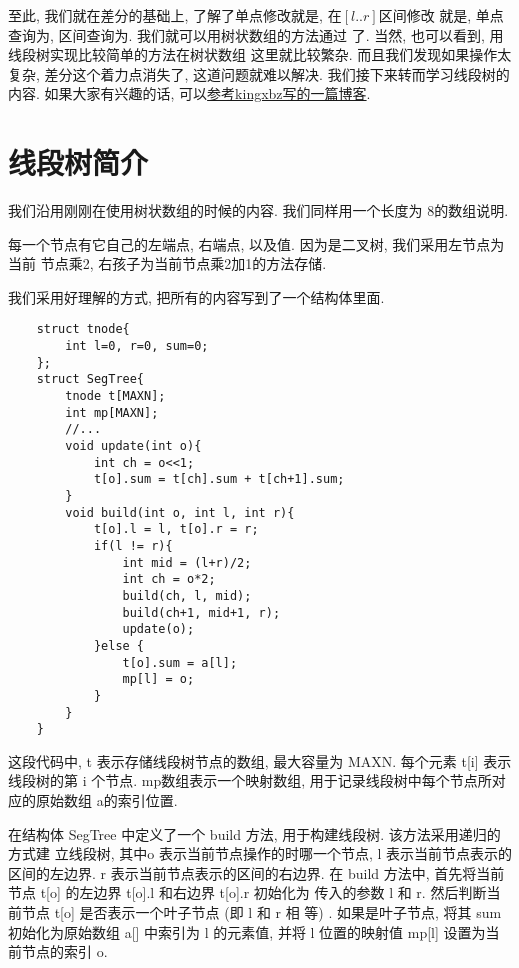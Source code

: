 至此,  我们就在差分的基础上, 了解了单点修改就是, 在$[l..r]$区间修改 
就是, 单点查询为, 
区间查询为. 我们就可以用树状数组的方法通过
了. 当然, 也可以看到, 用线段树实现比较简单的方法在树状数组
这里就比较繁杂. 而且我们发现如果操作太复杂, 差分这个着力点消失了, 这道问题就难以解决. 
我们接下来转而学习线段树的内容. 如果大家有兴趣的话, 可以\href{https://www.luogu.com.cn/blog/kingxbz/shu-zhuang-shuo-zu-zong-ru-men-dao-ru-fen}{参考kingxbz写的一篇博客}.

\section{线段树简介}

 我们沿用刚刚在使用树状数组的时候的内容. 我们同样用一个长度为
8的数组说明. 


每一个节点有它自己的左端点, 右端点, 以及值. 因为是二叉树, 我们采用左节点为当前
节点乘2, 右孩子为当前节点乘2加1的方法存储. 

 我们采用好理解的方式, 把所有的内容写到了一个结构体里面. 
\begin{lstlisting}
    struct tnode{
        int l=0, r=0, sum=0; 
    };
    struct SegTree{
        tnode t[MAXN]; 
        int mp[MAXN];
        //... 
        void update(int o){
            int ch = o<<1;
            t[o].sum = t[ch].sum + t[ch+1].sum;
        }
        void build(int o, int l, int r){
            t[o].l = l, t[o].r = r;
            if(l != r){
                int mid = (l+r)/2;
                int ch = o*2;
                build(ch, l, mid);
                build(ch+1, mid+1, r);
                update(o);
            }else {
                t[o].sum = a[l];
                mp[l] = o;
            }
        }
    }
\end{lstlisting}

这段代码中, t 表示存储线段树节点的数组, 最大容量为 MAXN. 每个元素 t[i] 表示线段树的第 i 个节点. mp数组表示一个映射数组, 用于记录线段树中每个节点所对应的原始数组 a的索引位置.  

在结构体 SegTree 中定义了一个 build 方法, 用于构建线段树. 该方法采用递归的方式建
立线段树, 其中o 表示当前节点操作的时哪一个节点, l 表示当前节点表示的区间的左边界. 
r 表示当前节点表示的区间的右边界. 
在 build 方法中, 首先将当前节点 t[o] 的左边界 t[o].l 和右边界 t[o].r 初始化为
传入的参数 l 和 r. 然后判断当前节点 t[o] 是否表示一个叶子节点 (即 l 和 r 相
等) . 如果是叶子节点, 将其 sum 初始化为原始数组 a[] 中索引为 l 的元素值, 并将 l 
位置的映射值 mp[l] 设置为当前节点的索引 o. 

